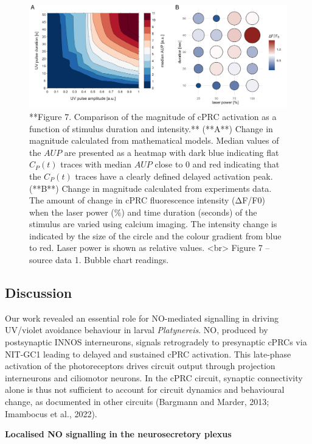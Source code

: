 \documentclass[
  10pt,
  onecolumn]{article}
\begin{document}
\begin{figure}
\includegraphics[width=52.08in]{figures/Fig7} \caption{**Figure 7. Comparison of the magnitude of cPRC activation as a function of stimulus duration and intensity.** (**A**) Change in magnitude calculated from mathematical models. Median values of the $AUP$ are presented as a heatmap with dark blue indicating flat $C_P(t)$ traces with median $AUP$ close to 0 and red indicating that the $C_P(t)$ traces have a clearly defined delayed activation peak. (**B**) Change in magnitude calculated from experiments data. The amount of change in cPRC fluorescence intensity (ΔF/F0) when the laser power (\%) and time duration (seconds) of the stimulus are varied using calcium imaging. The intensity change is indicated by the size of the circle and the colour gradient from blue to red. Laser power is shown as relative values. <br> Figure 7 -- source data 1. Bubble chart readings. }\label{fig:unnamed-chunk-7}
\end{figure}

\hypertarget{discussion}{%
\subsection{Discussion}\label{discussion}}

Our work revealed an essential role for NO-mediated signalling in
driving UV/violet avoidance behaviour in larval \emph{Platynereis}. NO,
produced by postsynaptic INNOS interneurons, signals retrogradely to
presynaptic cPRCs via NIT-GC1 leading to delayed and sustained cPRC
activation. This late-phase activation of the photoreceptors drives
circuit output through projection interneurons and ciliomotor neurons.
In the cPRC circuit, synaptic connectivity alone is thus not sufficient
to account for circuit dynamics and behavioural change, as documented in
other circuits (Bargmann and Marder, 2013; Imambocus et al., 2022).

\textbf{Localised NO signalling in the neurosecretory plexus}
\end{document}
